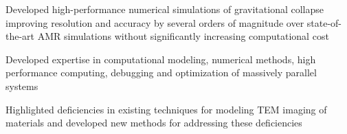 
\begin{cventries}

{
  \begin{cvitems} %
    \item Developed high-performance numerical simulations of gravitational collapse improving resolution and accuracy by several orders of magnitude over state-of-the-art AMR simulations without significantly increasing computational cost
    \item Developed expertise in computational modeling, numerical methods, high performance computing, debugging and optimization of massively parallel systems
  \end{cvitems}
}

{
  \begin{cvitems}
    \item Highlighted deficiencies in existing techniques for modeling TEM imaging of materials and developed new methods for addressing these deficiencies
  \end{cvitems}
}

\end{cventries}

